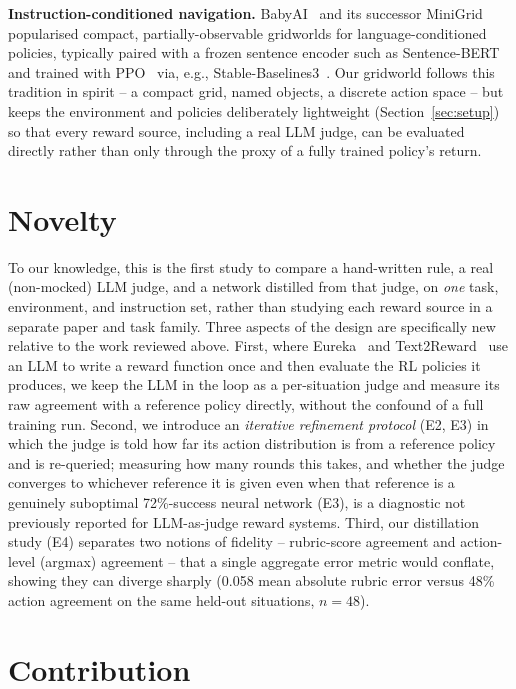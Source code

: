 \documentclass[10pt,twocolumn]{article}
\begin{document}
\textbf{Instruction-conditioned navigation.} BabyAI~\citep{
chevalierboisvert2019babyai} and its successor
MiniGrid~\citep{chevalierboisvert2023minigrid} popularised compact,
partially-observable gridworlds for language-conditioned policies,
typically paired with a frozen sentence encoder such as
Sentence-BERT~\citep{reimers2019sbert} and trained with PPO~\citep{
schulman2017ppo} via, e.g., Stable-Baselines3~\citep{raffin2021sb3}. Our
gridworld follows this tradition in spirit -- a compact grid, named
objects, a discrete action space -- but keeps the environment and
policies deliberately lightweight (Section~\ref{sec:setup}) so that
every reward source, including a real LLM judge, can be evaluated
directly rather than only through the proxy of a fully trained policy's
return.

\section{Novelty}
\label{sec:novelty}

To our knowledge, this is the first study to compare a hand-written
rule, a real (non-mocked) LLM judge, and a network distilled from that
judge, on \emph{one} task, environment, and instruction set, rather than
studying each reward source in a separate paper and task family. Three
aspects of the design are specifically new relative to the work reviewed
above. First, where Eureka~\citep{ma2024eureka} and
Text2Reward~\citep{xie2024text2reward} use an LLM to write a reward
function once and then evaluate the RL policies it produces, we keep the
LLM in the loop as a per-situation judge and measure its raw agreement
with a reference policy directly, without the confound of a full
training run. Second, we introduce an \emph{iterative refinement
protocol} (E2, E3) in which the judge is told how far its action
distribution is from a reference policy and is re-queried; measuring how
many rounds this takes, and whether the judge converges to whichever
reference it is given even when that reference is a genuinely suboptimal
72\%-success neural network (E3), is a diagnostic not previously
reported for LLM-as-judge reward systems. Third, our distillation study
(E4) separates two notions of fidelity -- rubric-score agreement and
action-level (argmax) agreement -- that a single aggregate error metric
would conflate, showing they can diverge sharply (0.058 mean absolute
rubric error versus 48\% action agreement on the same held-out
situations, $n=48$).

\section{Contribution}
\label{sec:contribution}
\end{document}
